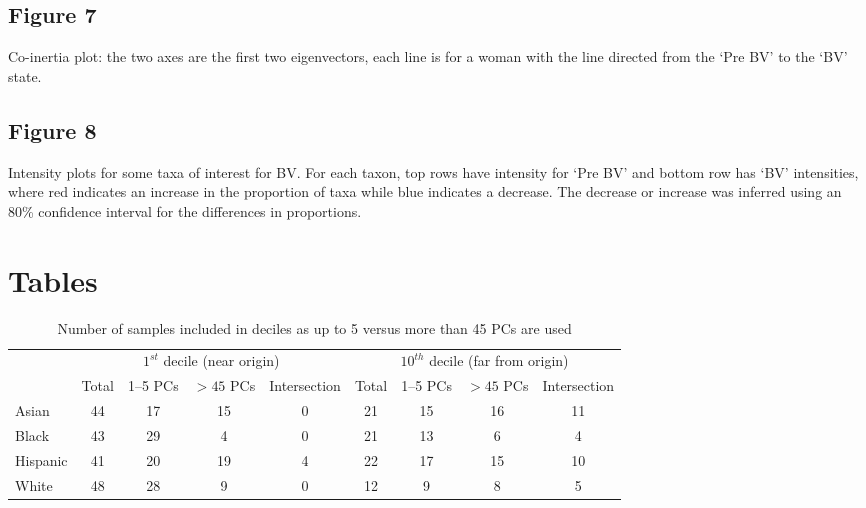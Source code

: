 \documentclass[doublespacing]{bmcart}
\begin{document}
\begin{backmatter}
\subsection* {Figure 7} Co-inertia plot: the two axes are the first two eigenvectors, each line is for a woman with the line directed from the `Pre BV' to the `BV' state.

\subsection* {Figure 8} Intensity plots for some taxa of interest for BV. For each taxon, top rows have intensity for `Pre BV'  and bottom row has `BV' intensities, where red indicates an increase in the proportion of taxa while blue indicates a decrease. The decrease or increase was inferred using an 80\% confidence interval for the differences in proportions.




\section*{Tables}

\begin{table}[h]
\caption{Number of samples included in deciles as up to 5 versus more than 45 PCs are used}
\begin{tabular}{|l||c|c|c|c||c|c|c|c|}
\hline
 &\multicolumn{4}{c||}{ $1^{st}$ decile (near origin)}&\multicolumn{4}{c|}{$10^{th}$ decile (far from origin)}\\
\cline{2-9}
 &Total& 1--5 PCs&$>45$ PCs&Intersection&Total& 1--5 PCs& $>45$ PCs&Intersection\\
\hline\hline
Asian&44&17&15&0&21&15&16&11\\
Black&43&29&4&0&21&13&6&4\\
Hispanic&41&20&19&4&22&17&15&10\\
White&48&28&9&0&12&9&8&5\\
\hline
\end{tabular}
\label{table:deciles}
\end{table}


\end{backmatter}
\end{document}
